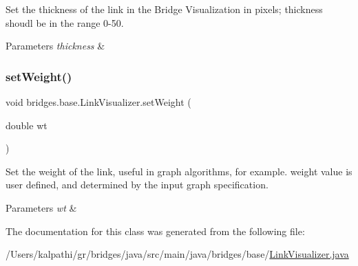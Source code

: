 Set the thickness of the link in the Bridge Visualization in pixels; thickness shoudl be in the range 0-\/50.


\begin{DoxyParams}{Parameters}
{\em thickness} & \\
\hline
\end{DoxyParams}
\mbox{\label{classbridges_1_1base_1_1_link_visualizer_a21d5884d243cf5a08f9d544f5083a44c}} 
\subsubsection{\texorpdfstring{setWeight()}{setWeight()}}
{\footnotesize\ttfamily void bridges.\+base.\+Link\+Visualizer.\+set\+Weight (\begin{DoxyParamCaption}\item[{double}]{wt }\end{DoxyParamCaption})}

Set the weight of the link, useful in graph algorithms, for example. weight value is user defined, and determined by the input graph specification.


\begin{DoxyParams}{Parameters}
{\em wt} & \\
\hline
\end{DoxyParams}


The documentation for this class was generated from the following file\+:\begin{DoxyCompactItemize}
\item 
/\+Users/kalpathi/gr/bridges/java/src/main/java/bridges/base/\mbox{\hyperlink{_link_visualizer_8java}{Link\+Visualizer.\+java}}\end{DoxyCompactItemize}
